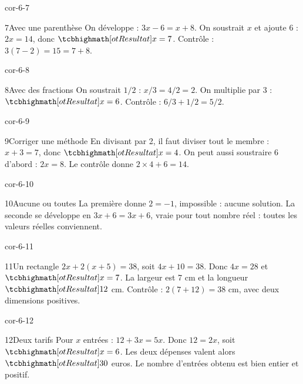 \begin{blocLivre}{cor-6-7}\begin{corrige}{7}{Avec une parenthèse}
On développe : $3x-6=x+8$. On soustrait $x$ et ajoute 6 : $2x=14$, donc $\res{x=7}$. Contrôle : $3(7-2)=15=7+8$.
\end{corrige}\end{blocLivre}
\begin{blocLivre}{cor-6-8}\begin{corrige}{8}{Avec des fractions}
On soustrait $1/2$ : $x/3=4/2=2$. On multiplie par 3 : $\res{x=6}$. Contrôle : $6/3+1/2=5/2$.
\end{corrige}\end{blocLivre}
\begin{blocLivre}{cor-6-9}\begin{corrige}{9}{Corriger une méthode}
En divisant par 2, il faut diviser tout le membre : $x+3=7$, donc $\res{x=4}$. On peut aussi soustraire 6 d’abord : $2x=8$. Le contrôle donne $2\times4+6=14$.
\end{corrige}\end{blocLivre}
\begin{blocLivre}{cor-6-10}\begin{corrige}{10}{Aucune ou toutes}
La première donne $2=-1$, impossible : aucune solution. La seconde se développe en $3x+6=3x+6$, vraie pour tout nombre réel : toutes les valeurs réelles conviennent.
\end{corrige}\end{blocLivre}
\begin{blocLivre}{cor-6-11}\begin{corrige}{11}{Un rectangle}
$2x+2(x+5)=38$, soit $4x+10=38$. Donc $4x=28$ et $\res{x=7}$. La largeur est 7 cm et la longueur $\res{12}$ cm. Contrôle : $2(7+12)=38$ cm, avec deux dimensions positives.
\label{fig-cor-6-11}
\end{corrige}\end{blocLivre}
\begin{blocLivre}{cor-6-12}\begin{corrige}{12}{Deux tarifs}
Pour $x$ entrées : $12+3x=5x$. Donc $12=2x$, soit $\res{x=6}$. Les deux dépenses valent alors $\res{30}$ euros. Le nombre d’entrées obtenu est bien entier et positif.
\end{corrige}\end{blocLivre}
